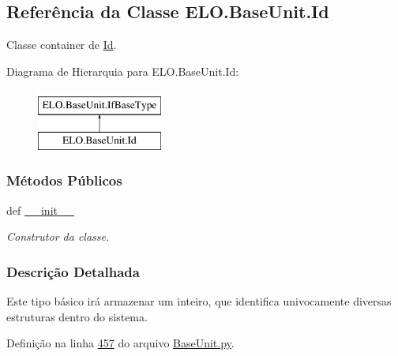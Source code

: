 \hypertarget{classELO_1_1BaseUnit_1_1Id}{\subsection{Referência da Classe E\-L\-O.\-Base\-Unit.\-Id}
\label{classELO_1_1BaseUnit_1_1Id}
}


Classe container de \hyperlink{classELO_1_1BaseUnit_1_1Id}{Id}.  


Diagrama de Hierarquia para E\-L\-O.\-Base\-Unit.\-Id\-:\begin{figure}[H]
\begin{center}
\leavevmode
\includegraphics[height=2.000000cm]{d7/dca/classELO_1_1BaseUnit_1_1Id}
\end{center}
\end{figure}
\subsubsection*{Métodos Públicos}
\begin{DoxyCompactItemize}
\item 
def \hyperlink{classELO_1_1BaseUnit_1_1Id_adc3e24ef020fb79dda540cdbec85b7a8}{\-\_\-\-\_\-init\-\_\-\-\_\-}
\begin{DoxyCompactList}\small\item\em Construtor da classe. \end{DoxyCompactList}\end{DoxyCompactItemize}


\subsubsection{Descrição Detalhada}
Este tipo básico irá armazenar um inteiro, que identifica univocamente diversas estruturas dentro do sistema. 

Definição na linha \hyperlink{BaseUnit_8py_source_l00457}{457} do arquivo \hyperlink{BaseUnit_8py_source}{Base\-Unit.\-py}.



